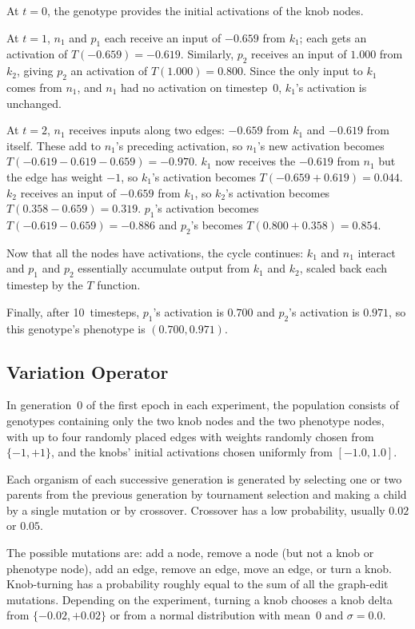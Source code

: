 \documentclass[letterpaper]{article}
\begin{document}
At $t{=}0$, the genotype provides the initial activations of the knob nodes.

At $t{=}1$, $n_1$ and $p_1$ each receive an input of $-0.659$ from $k_1$; each
gets an activation of $T(-0.659)=-0.619$. Similarly, $p_2$ receives an input
of $1.000$ from $k_2$, giving $p_2$ an activation of $T(1.000)=0.800$.
Since the only input to $k_1$ comes from $n_1$, and $n_1$ had no activation on
timestep~0, $k_1$'s activation is unchanged.

At $t{=}2$, $n_1$ receives inputs along two edges: $-0.659$ from $k_1$ and
$-0.619$ from itself. These add to $n_1$'s preceding activation, so $n_1$'s
new activation becomes $T(-0.619 - 0.619 - 0.659)=-0.970$. $k_1$ now receives
the $-0.619$ from $n_1$ but the edge has weight $-1$, so $k_1$'s activation
becomes $T(-0.659 + 0.619)=0.044$. $k_2$ receives an input of $-0.659$ from
$k_1$, so $k_2$'s activation becomes $T(0.358 - 0.659)=0.319$.  $p_1$'s
activation becomes $T(-0.619 - 0.659)=-0.886$ and $p_2$'s becomes $T(0.800 +
0.358)=0.854$.

Now that all the nodes have activations, the cycle continues: $k_1$ and $n_1$
interact and $p_1$ and $p_2$ essentially accumulate output from $k_1$ and
$k_2$, scaled back each timestep by the $T$ function.

Finally, after 10~timesteps, $p_1$'s activation is $0.700$ and $p_2$'s
activation is $0.971$, so this genotype's phenotype is $(0.700,0.971)$.

\subsection{Variation Operator}

In generation~0 of the first epoch in each experiment, the population consists
of genotypes containing only the two knob nodes and the two phenotype nodes,
with up to four randomly placed edges with weights randomly chosen from $\{-1,
+1\}$, and the knobs' initial activations chosen uniformly from $[-1.0, 1.0]$.

Each organism of each successive generation is generated by selecting one or
two parents from the previous generation by tournament selection and making a
child by a single mutation or by crossover.  Crossover has a low probability,
usually $0.02$ or $0.05$.

The possible mutations are: add a node, remove a node (but not a knob or
phenotype node), add an edge, remove an edge, move an edge, or turn a knob.
Knob-turning has a probability roughly equal to the sum of all the graph-edit
mutations. Depending on the experiment, turning a knob chooses a knob delta
from $\{-0.02, +0.02\}$ or from a normal distribution with mean~0 and
$\sigma = 0.0$.
\end{document}
